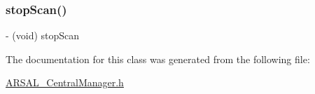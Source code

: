 \subsubsection{\texorpdfstring{stop\+Scan()}{stopScan()}}
{\footnotesize\ttfamily -\/ (void) stop\+Scan \begin{DoxyParamCaption}{ }\end{DoxyParamCaption}}



The documentation for this class was generated from the following file\+:\begin{DoxyCompactItemize}
\item 
\hyperlink{ARSAL__CentralManager_8h}{A\+R\+S\+A\+L\+\_\+\+Central\+Manager.\+h}\end{DoxyCompactItemize}
